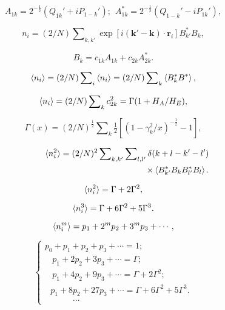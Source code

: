 \documentclass{article}
\begin{document}
\begin{equation} \label{eq:100}
A_{1k}=2^{-\frac{1}{2}}(Q_{1k}'+iP_{1-k}');~~A_{1k}^*=2^{-\frac{1}{2}}(Q_{1-k}'-iP_{1k}'),
\end{equation}

\begin{equation} \label{eq:101}
n_i=(2/N)\sum\nolimits_{k,k'}\exp[i(\mathbf{k}'-\mathbf{k})\cdot\mathbf{r}_i]B_{k'}^*B_k,
\end{equation}

\begin{equation} \label{eq:102}
B_k=c_{1k}A_{1k}+c_{2k}A_{2k}^*.
\end{equation}

\begin{equation} \label{eq:103}
\braket{n_i}=(2/N)\sum\nolimits_i\braket{n_i}=(2/N)\sum\nolimits_k\braket{B_k^*B^*},
\end{equation}

\begin{equation} \label{eq:104}
\braket{n_i}=(2/N)\sum\nolimits_kc_{2k}^2=\Gamma(1+H_A/H_E),
\end{equation}

\begin{equation} \label{eq:105}
\Gamma(x)=(2/N)^\frac{1}{2}\sum\nolimits_k\tfrac{1}{2}[(1-\gamma_k^2/x)^{-\frac{1}{2}}-1],
\end{equation}

\begin{eqnarray} \label{eq:106}
&&\braket{n_i^2}=(2/N)^2\sum\nolimits_{k,k'}\sum\nolimits_{l,l'}\delta(k+l-k'-l')\nonumber\\
&&~~~~~~~~~~~~~~~~~~~~~~~~~~~~~~~~~~~~~~~~~~~\times\braket{B_{k'}^*B_kB_{l'}^*B_l}.
\end{eqnarray}

\begin{equation} \label{eq:107}
\braket{n_i^2}=\Gamma+2\Gamma^2,
\end{equation}

\begin{equation} \label{eq:108}
\braket{n_i^3}=\Gamma+6\Gamma^2+5\Gamma^3.
\end{equation}

\begin{equation} \label{eq:109}
\braket{n_i^m}=p_1+2^mp_2+3^mp_3+\cdots,
\end{equation}

\begin{equation} \label{eq:110}
\left\{
\begin{array}{l}
p_0+p_1+p_2+p_3+\cdots=1;\\
~~~~p_1+2p_2+3p_3+\cdots=\Gamma;\\
~~~~p_1+4p_2+9p_3+\cdots=\Gamma+2\Gamma^2;\\
~~~p_1+8p_2+27p_3+\cdots=\Gamma+6\Gamma^2+5\Gamma^3.\\
~~~~~~~~~~~~~~~\cdots
\end{array}
\right.
\end{equation}
\end{document}
